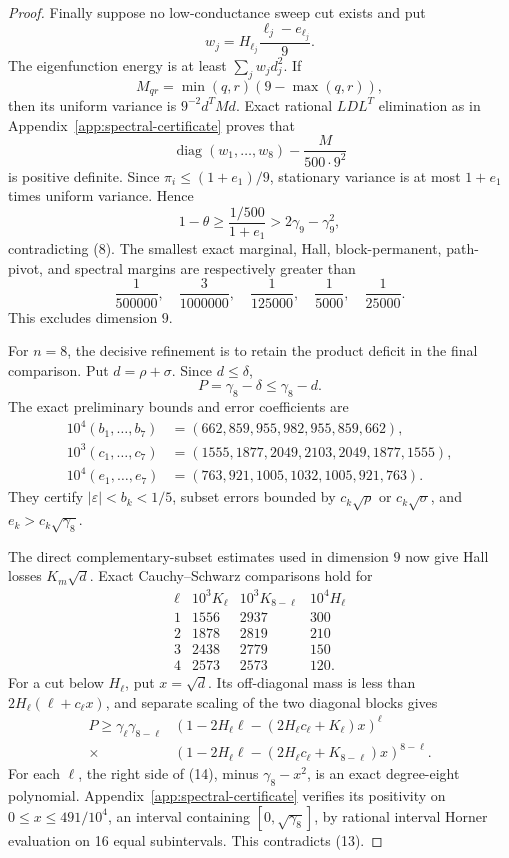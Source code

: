 \documentclass[11pt]{amsart}
\theoremstyle{definition}
\theoremstyle{remark}
\newenvironment{exacttable}
  {\begingroup\small
   \setlength{\arraycolsep}{4pt}%
   \renewcommand{\arraystretch}{1.12}}
  {\endgroup}
\begin{document}
\begin{proof}
Finally suppose no low-conductance sweep cut exists and put
\[
w_j=H_{\ell_j}\frac{\ell_j-e_{\ell_j}}9.
\]
The eigenfunction energy is at least \(\sum_jw_jd_j^2\). If
\[
M_{qr}=\min(q,r)(9-\max(q,r)),
\]
then its uniform variance is \(9^{-2}d^TMd\). Exact rational
\(LDL^T\) elimination as in
Appendix~\ref{app:spectral-certificate} proves that
\[
\operatorname{diag}(w_1,\ldots,w_8)-\frac{M}{500\cdot9^2}
\]
is positive definite. Since \(\pi_i\leq(1+e_1)/9\),
stationary variance is at most \(1+e_1\) times uniform variance. Hence
\[
1-\theta\geq\frac{1/500}{1+e_1}>2\gamma_9-\gamma_9^2,
\]
contradicting (8).  The smallest exact marginal, Hall,
block-permanent, path-pivot, and spectral margins are respectively greater
than
\[
\frac1{500000},\quad\frac3{1000000},\quad
\frac1{125000},\quad\frac1{5000},\quad
\frac1{25000}.
\]
This excludes dimension \(9\).

For \(n=8\), the decisive refinement is to retain the product deficit in the
final comparison. Put \(d=\rho+\sigma\). Since \(d\leq\delta\),
\[
P=\gamma_8-\delta\leq\gamma_8-d.                   \tag{13}
\]
The exact preliminary bounds and error coefficients are
\[
\begin{split}
10^4(b_1,\ldots,b_7)&=(662,859,955,982,955,859,662),\\
10^3(c_1,\ldots,c_7)&=(1555,1877,2049,2103,2049,1877,1555),\\
10^4(e_1,\ldots,e_7)&=(763,921,1005,1032,1005,921,763).
\end{split}
\]
They certify \(|\varepsilon|<b_k<1/5\), subset errors bounded by
\(c_k\sqrt\rho\) or \(c_k\sqrt\sigma\), and
\(e_k>c_k\sqrt{\gamma_8}\).

The direct complementary-subset estimates used in dimension \(9\) now give
Hall losses \(K_m\sqrt d\). Exact Cauchy--Schwarz comparisons hold for
\begin{exacttable}
\[
\begin{array}{c|c|c|c}
\ell&10^3K_\ell&10^3K_{8-\ell}&10^4H_\ell\\ \hline
1&1556&2937&300\\
2&1878&2819&210\\
3&2438&2779&150\\
4&2573&2573&120 .
\end{array}
\]
\end{exacttable}
For a cut below \(H_\ell\), put \(x=\sqrt d\). Its off-diagonal mass is less
than \(2H_\ell(\ell+c_\ell x)\), and separate scaling of the two diagonal
blocks gives
\[
\begin{split}
P\geq\gamma_\ell\gamma_{8-\ell}
&\left(1-2H_\ell\ell-(2H_\ell c_\ell+K_\ell)x\right)^\ell\\
\times&
\left(1-2H_\ell\ell-(2H_\ell c_\ell+K_{8-\ell})x\right)^{8-\ell}.
\end{split}                                         \tag{14}
\]
For each \(\ell\), the right side of (14), minus
\(\gamma_8-x^2\), is an exact degree-eight polynomial.
Appendix~\ref{app:spectral-certificate} verifies
its positivity on \(0\leq x\leq491/10^4\), an interval containing
\([0,\sqrt{\gamma_8}]\), by rational interval Horner evaluation on 16 equal
subintervals. This contradicts (13).


\end{proof}
\end{document}
